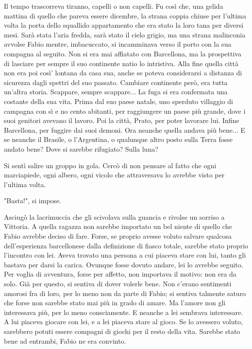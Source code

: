 Il tempo trascorreva tiranno, capelli o non capelli. Fu così che, una gelida mattina di quello che pareva essere dicembre, la strana coppia chiuse per l'ultima volta la porta dello squallido appartamento che era stato la loro tana per diversi mesi. Sarà stata l'aria fredda, sarà stato il cielo grigio, ma una strana malinconia avvolse Fabio mentre, imbacuccato, si incamminava verso il porto con la sua compagna al seguito. Non si era mai affiatato con Barcellona, ma la prospettiva di lasciare per sempre il suo continente natio lo intristiva. Alla fine quella città non era poi così' lontana da casa sua, anche se poteva considerarsi a distanza di sicurezza dagli spettri del suo passato. Cambiare continente però, era tutta un'altra storia. Scappare, sempre scappare... La fuga si era confermata una costante della sua vita. Prima dal suo paese natale, uno sperduto villaggio di campagna con sì e no cento abitanti, per raggiungere un paese più grande, dove i suoi genitori avevano il lavoro. Poi la città, Prato, per poter lavorare lui. Infine Barcellona, per fuggire dai suoi demoni. Ora neanche quella andava più bene... E se neanche il Brasile, o l'Argentina, o qualunque altro posto sulla Terra fosse andato bene? Dove si sarebbe rifugiato? Sulla luna?

Si sentì salire un groppo in gola. Cercò di non pensare al fatto che ogni marciapiede, ogni albero, ogni vicolo che attraversava lo avrebbe visto per l'ultima volta.

"Basta!", si impose.

Asciugò la lacrimuccia che gli scivolava sulla guancia e rivolse un sorriso a Vittoria. A quella ragazza non sarebbe importato un bel niente di quello che Fabio avrebbe deciso di fare. Forse, se proprio avesse voluto salvare qualcosa dell'esperienza barcellonese dalla definizione di fiasco totale, sarebbe stato proprio l'incontro con lei. Aveva trovato una persona a cui piaceva stare con lui, tanto gli bastava per darsi la carica. Ovunque fosse dovuto andare, lei lo avrebbe seguito. Per voglia di avventura, forse per affetto, non importava il motivo: non era da solo. Già per questo, si sentiva di dover volerle bene. Non c'erano sentimenti amorosi fra di loro, per lo meno non da parte di Fabio; si sentiva talmente saturo che forse non sarebbe stato mai più in grado di amare. Ma l'amore non gli interessava più, per lo meno consciamente. E neanche a lei sembrava interessare. A lui piaceva giocare con lei, e a lei piaceva stare al gioco. Se lo avessero voluto, sarebbero potuti essere compagni di giochi per il resto della vita. Sarebbe stato bene ad entrambi, Fabio ne era convinto.

